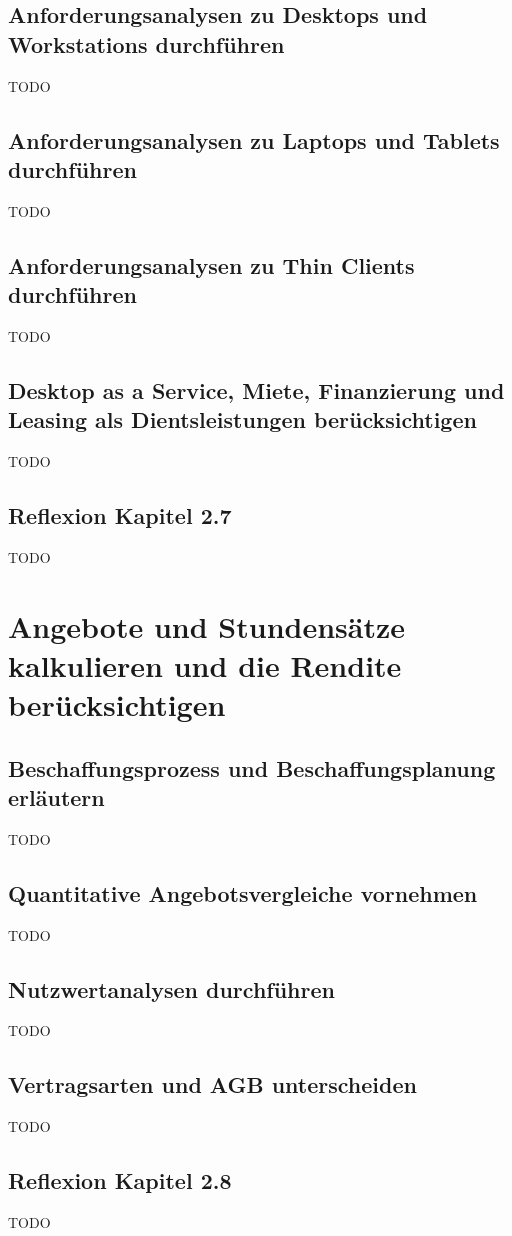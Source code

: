 \documentclass[11pt]{article}
\begin{document}
\subsection{Anforderungsanalysen zu Desktops und Workstations durchführen}
    TODO
\subsection{Anforderungsanalysen zu Laptops und Tablets durchführen}
    TODO
\subsection{Anforderungsanalysen zu Thin Clients durchführen}
    TODO
\subsection{Desktop as a Service, Miete, Finanzierung und Leasing als Dientsleistungen berücksichtigen}
    TODO
\subsection*{Reflexion Kapitel 2.7}
    TODO

\newpage
\section{Angebote und Stundensätze kalkulieren und die Rendite berücksichtigen}
\subsection{Beschaffungsprozess und Beschaffungsplanung erläutern}
    TODO
\subsection{Quantitative Angebotsvergleiche vornehmen}
    TODO
\subsection{Nutzwertanalysen durchführen}
    TODO
\subsection{Vertragsarten und AGB unterscheiden}
    TODO
\subsection*{Reflexion Kapitel 2.8}
    TODO
\end{document}

